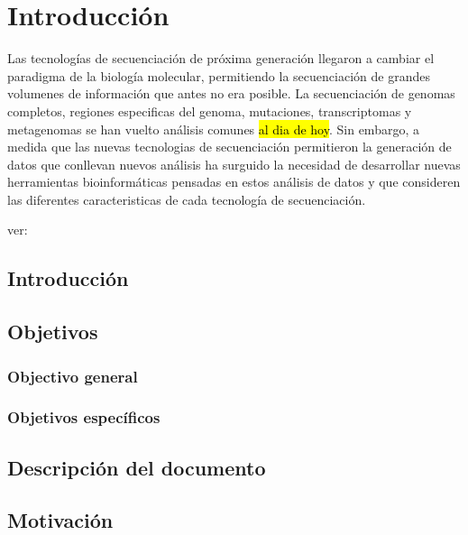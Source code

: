 \chapter{Introducción}
Las tecnologías de secuenciación de próxima generación llegaron a cambiar el paradigma de la biología molecular, permitiendo la secuenciación de grandes volumenes de información que antes no era posible. La secuenciación de genomas completos, regiones especificas del genoma, mutaciones, transcriptomas y metagenomas se han vuelto análisis comunes \hl{al dia de hoy}. Sin embargo, a medida que las nuevas tecnologias de secuenciación permitieron la generación de datos que conllevan nuevos análisis ha surguido la necesidad de desarrollar nuevas herramientas bioinformáticas pensadas en estos análisis de datos y que consideren las diferentes caracteristicas de cada tecnología de secuenciación.

ver:
\section{Introducción}
\section{Objetivos}
\subsection{Objectivo general}
\subsection{Objetivos específicos}
\section{Descripción del documento}
\section{Motivación}
